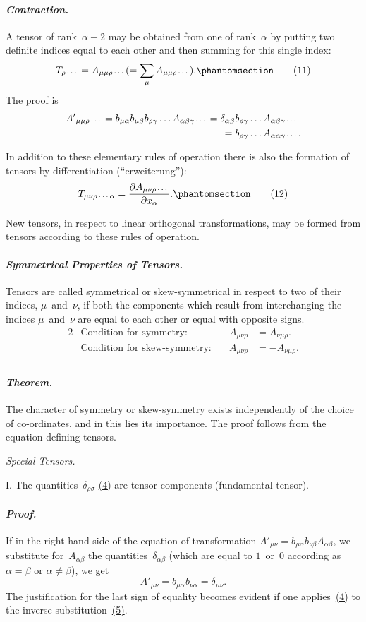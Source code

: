 \documentclass[12pt]{book}[2005/09/16]
\newcommand{\Subsection}[1]{%
  \pagebreak[1]\textit{#1}\pagebreak[0]
}
\newcommand{\Paragraph}[1]{\paragraph*{\indent\normalfont\itshape#1}}
\newcommand{\Change}[2]{#2}
\newcommand{\Add}[1]{\Change{}{#1}}
\newcommand{\PageSep}[1]{\ignorespaces}
\newcommand{\Tag}[1]{%
  \phantomsection
  \label{eqn:#1}
  \tag*{#1}
}
\newcommand{\Eqref}[1]{\hyperref[eqn:#1]{#1}}
\newcommand{\dd}{\partial}
\newcommand{\Subdots}{\,\mbox{\footnotesize$\cdots$}}
\begin{document}
\Paragraph{Contraction.} A tensor of rank~$\alpha - 2$ may be obtained
%
%
from one of rank~$\alpha$ by putting two definite indices equal
to each other and then summing for this single index:
\[
T_{\rho\Subdots}
  = A_{\mu\mu\rho\Subdots}
  ( = \sum_{\mu} A_{\mu\mu\rho\Subdots})\Add{.}
\Tag{(11)}
\]
The proof is
\begin{align*}
{A'}_{\mu\mu\rho\Subdots}
  = b_{\mu\alpha} b_{\mu\beta} b_{\rho\gamma}\dots A_{\alpha\beta\gamma\Subdots}
  = \delta_{\alpha\beta} & b_{\rho\gamma}\dots A_{\alpha\beta\gamma\Subdots} \\
  {} ={} & b_{\rho\gamma}\dots A_{\alpha\alpha\gamma\Subdots}\Add{.}
\end{align*}

In addition to these elementary rules of operation
there is also the formation of tensors by differentiation
(``erweiterung''):
\[
T_{\mu\nu\rho\Subdots\alpha}
  = \frac{\dd A_{\mu\nu\rho\Subdots}}{\dd x_{\alpha}}\Add{.}
\Tag{(12)}
\]

New tensors, in respect to linear orthogonal transformations,
may be formed from tensors according to these rules
of operation.

\Paragraph{Symmetrical Properties of Tensors.} Tensors are called
%
%
%
symmetrical or skew-symmetrical in respect to two of
their indices, $\mu$~and~$\nu$, if both the components which result
from interchanging the indices $\mu$~and~$\nu$ are equal to each
other or equal with opposite signs.
\begin{alignat*}{2}
&\text{Condition for symmetry:} &
  A_{\mu\nu\rho} &= A_{\Change{\mu\nu}{\nu\mu}\rho}. \\
&\text{Condition for skew-symmetry:}\quad &
  A_{\mu\nu\rho} &= -A_{\nu\mu\rho}. \\
\end{alignat*}

\Paragraph{Theorem.} The character of symmetry or skew-symmetry
exists independently of the choice of co-ordinates, and in
\PageSep{16}
this lies its importance. The proof follows from the
equation defining tensors.

\Subsection{Special Tensors.}

I\@. The quantities~$\delta_{\rho\sigma}$ \Eqref{(4)} are tensor components (fundamental
tensor).

\Paragraph{Proof.} If in the right-hand side of the equation of
transformation ${A'}_{\mu\nu} = b_{\mu\alpha} b_{\nu\beta} A_{\alpha\beta}$, we substitute for~$A_{\alpha\beta}$ the
quantities~$\delta_{\alpha\beta}$ (which are equal to $1$~or~$0$ according as
$\alpha = \beta$ or $\alpha \Change{ }{\neq} \beta$), we get
\[
{A'}_{\mu\nu} = b_{\mu\alpha} b_{\nu\alpha} = \delta_{\mu\nu}.
\]
The justification for the last sign of equality becomes
evident if one applies~\Eqref{(4)} to the inverse substitution~\Eqref{(5)}.
\end{document}
